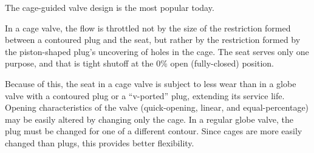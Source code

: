 





The cage-guided valve design is the most popular today.

\vskip 10pt

In a cage valve, the flow is throttled not by the size of the restriction formed between a contoured plug and the seat, but rather by the restriction formed by the piston-shaped plug's uncovering of holes in the cage.  The seat serves only one purpose, and that is tight shutoff at the 0\% open (fully-closed) position.

Because of this, the seat in a cage valve is subject to less wear than in a globe valve with a contoured plug or a ``v-ported'' plug, extending its service life.  Opening characteristics of the valve (quick-opening, linear, and equal-percentage) may be easily altered by changing only the cage.  In a regular globe valve, the plug must be changed for one of a different contour.  Since cages are more easily changed than plugs, this provides better flexibility.











